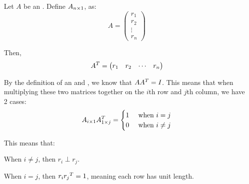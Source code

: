 \begin{blackbox}
  Let $A$ be an .
  Define $A_{n \times 1}$, as:
  \begin{equation*}
    A =
    \begin{pmatrix}
      r_{1} \\ r_{2} \\ \vdots \\ r_{n}
    \end{pmatrix}
  \end{equation*}

  Then,
  \begin{equation*}
    {A}^{T} =
    \begin{pmatrix}
      r_{1} & r_{2} & \cdots & r_{n}
    \end{pmatrix}
  \end{equation*}

  By the definition of an  and , we know that $A {A}^{T} = I$.
  This means that when multiplying these two matrices together on the $i$th row and $j$th column, we have 2 cases:
  \begin{equation*}
    A_{i \times 1} {A}^{T}_{1 \times j} =
    \begin{cases}
      1 & \text{ when } i = j \\
      0 & \text{ when } i \neq j
    \end{cases}
  \end{equation*}

  This means that:
  \begin{description}[noitemsep]
  \item When $i \neq j$, then $r_{i} \perp r_{j}$.
  \item When $i = j$, then $r_{i} {r_{j}}^{T} = 1$, meaning each row has unit length.
  \end{description}
\end{blackbox}

